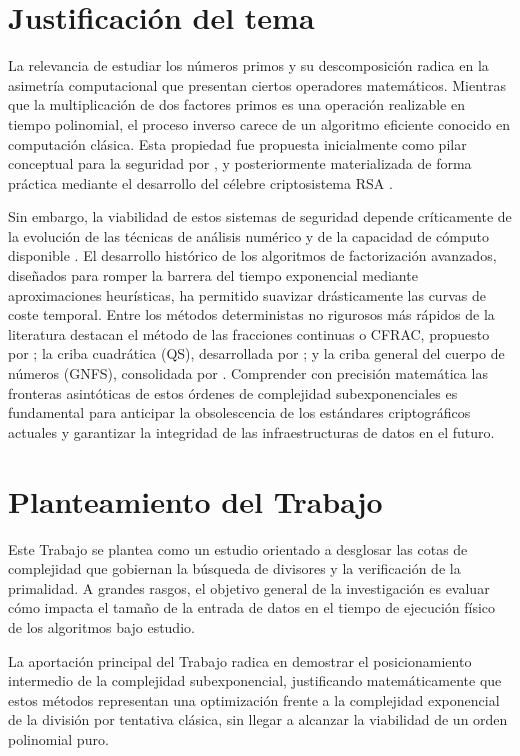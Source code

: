 \documentclass[11pt,a4paper,spanish]{book}
\begin{document}
\section{Justificación del tema}
La relevancia de estudiar los números primos y su descomposición radica en la asimetría computacional que presentan ciertos operadores matemáticos. Mientras que la multiplicación de dos factores primos es una operación realizable en tiempo polinomial, el proceso inverso carece de un algoritmo eficiente conocido en computación clásica. Esta propiedad fue propuesta inicialmente como pilar conceptual para la seguridad por \citep{diffie1976}, y posteriormente materializada de forma práctica mediante el desarrollo del célebre criptosistema RSA \citep{rivest1978}.

Sin embargo, la viabilidad de estos sistemas de seguridad depende críticamente de la evolución de las técnicas de análisis numérico y de la capacidad de cómputo disponible \citep{odlyzko1995}. El desarrollo histórico de los algoritmos de factorización avanzados, diseñados para romper la barrera del tiempo exponencial mediante aproximaciones heurísticas, ha permitido suavizar drásticamente las curvas de coste temporal. Entre los métodos deterministas no rigurosos más rápidos de la literatura destacan el método de las fracciones continuas o CFRAC, propuesto por \citet{morrison1975}; la criba cuadrática (QS), desarrollada por \citet{pomerance1982}; y la criba general del cuerpo de números (GNFS), consolidada por \citet{lenstra1993}. Comprender con precisión matemática las fronteras asintóticas de estos órdenes de complejidad subexponenciales es fundamental para anticipar la obsolescencia de los estándares criptográficos actuales y garantizar la integridad de las infraestructuras de datos en el futuro.
\section{Planteamiento del Trabajo}
Este Trabajo se plantea como un estudio orientado a desglosar las cotas de complejidad que gobiernan la búsqueda de divisores y la verificación de la primalidad. A grandes rasgos, el objetivo general de la investigación es evaluar cómo impacta el tamaño de la entrada de datos en el tiempo de ejecución físico de los algoritmos bajo estudio. 

La aportación principal del Trabajo radica en demostrar el posicionamiento intermedio de la complejidad subexponencial, justificando matemáticamente que estos métodos representan una optimización frente a la complejidad exponencial de la división por tentativa clásica, sin llegar a alcanzar la viabilidad de un orden polinomial puro.
\end{document}
